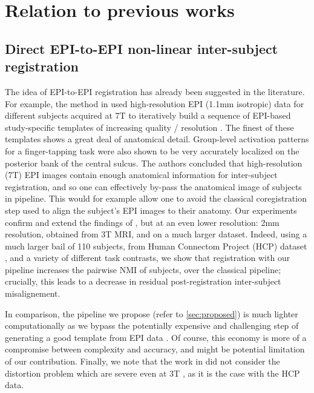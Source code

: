 \section{Relation to previous  works}
\subsection{Direct EPI-to-EPI non-linear inter-subject  registration}
The idea of EPI-to-EPI registration has already been suggested in the
literature. For example, the method in \cite{grabner2014} used
high-resolution EPI (1.1mm isotropic) data for different subjects
acquired at 7T to iteratively build a sequence of EPI-based
study-specific templates of increasing quality / resolution
\cite{pmid17354756}. The finest of these templates shows a great deal
of anatomical detail. Group-level activation patterns for a
finger-tapping task were also shown to be very accurately localized on
the posterior bank of the central sulcus. The authors concluded that
high-resolution (7T) EPI images contain enough anatomical information
for inter-subject registration, and so one can effectively by-pass the
anatomical image of subjects in pipeline. This would for example allow
one to avoid the classical coregistration step used to align the
subject's EPI images to their anatomy.  Our experiments confirm and
extend the findings of \cite{grabner2014}, but at an even lower
resolution: 2mm resolution, obtained from 3T MRI, and on a much larger
dataset. Indeed, using a much larger bail of 110 subjects, from Human
Connectom Project (HCP) dataset \cite{VanEssen20122222}, and a variety
of different task contrasts, we show that registration with our
pipeline increases the pairwise NMI of subjects, over the classical
pipeline; crucially, this leads to a decrease in residual
post-registration inter-subject misalignement.


In comparison, the pipeline we propose (refer to \ref{sec:proposed})
is much lighter computationally as
we bypass the potentially expensive and challenging step of generating a good
template from EPI data \cite{pmid17354756}. Of course, this economy is
more of a compromise between complexity and accuracy, and might be potential
limitation of our
contribution.  Finally, we note that the work in \cite{grabner2014}
did not consider the distortion problem which are severe even at 3T
\cite{anderson2003}, as it is the case with the HCP data.

